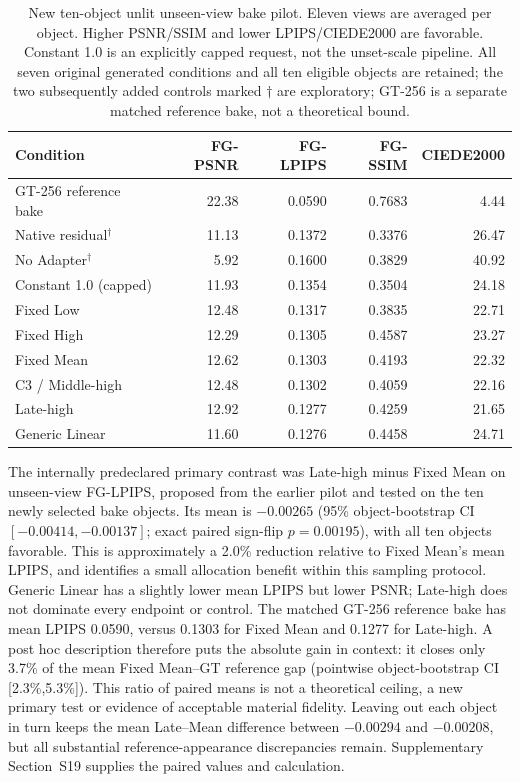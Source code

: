 \documentclass[times,twocolumn,final]{elsarticle}
\begin{document}
\begin{table}[ht]
\centering\scriptsize
\caption{New ten-object unlit unseen-view bake pilot. Eleven views are averaged per object. Higher PSNR/SSIM and lower LPIPS/CIEDE2000 are favorable. Constant 1.0 is an explicitly capped request, not the unset-scale pipeline. All seven original generated conditions and all ten eligible objects are retained; the two subsequently added controls marked $\dagger$ are exploratory; GT-256 is a separate matched reference bake, not a theoretical bound.}
\label{tab:new-bake}
\begin{tabular}{lrrrr}
\toprule Condition & FG-PSNR & FG-LPIPS & FG-SSIM & CIEDE2000 \\
\midrule
GT-256 reference bake & 22.38 & 0.0590 & 0.7683 & 4.44 \\
\midrule
Native residual$^\dagger$ & 11.13 & 0.1372 & 0.3376 & 26.47 \\
No Adapter$^\dagger$ & 5.92 & 0.1600 & 0.3829 & 40.92 \\
Constant 1.0 (capped) & 11.93 & 0.1354 & 0.3504 & 24.18 \\
Fixed Low & 12.48 & 0.1317 & 0.3835 & 22.71 \\
Fixed High & 12.29 & 0.1305 & 0.4587 & 23.27 \\
Fixed Mean & 12.62 & 0.1303 & 0.4193 & 22.32 \\
C3 / Middle-high & 12.48 & 0.1302 & 0.4059 & 22.16 \\
Late-high & 12.92 & 0.1277 & 0.4259 & 21.65 \\
Generic Linear & 11.60 & 0.1276 & 0.4458 & 24.71 \\
\bottomrule\end{tabular}
\end{table}

The internally predeclared primary contrast was Late-high minus Fixed Mean on unseen-view FG-LPIPS, proposed from the earlier pilot and tested on the ten newly selected bake objects. Its mean is $-0.00265$ (95\% object-bootstrap CI $[-0.00414,-0.00137]$; exact paired sign-flip $p=0.00195$), with all ten objects favorable. This is approximately a 2.0\% reduction relative to Fixed Mean's mean LPIPS, and identifies a small allocation benefit within this sampling protocol. Generic Linear has a slightly lower mean LPIPS but lower PSNR; Late-high does not dominate every endpoint or control. The matched GT-256 reference bake has mean LPIPS 0.0590, versus 0.1303 for Fixed Mean and 0.1277 for Late-high. A post hoc description therefore puts the absolute gain in context: it closes only 3.7\% of the mean Fixed Mean--GT reference gap (pointwise object-bootstrap CI [2.3\%,5.3\%]). This ratio of paired means is not a theoretical ceiling, a new primary test or evidence of acceptable material fidelity. Leaving out each object in turn keeps the mean Late--Mean difference between $-0.00294$ and $-0.00208$, but all substantial reference-appearance discrepancies remain. Supplementary Section~S19 supplies the paired values and calculation.
\end{document}
